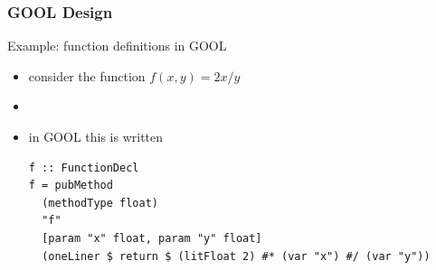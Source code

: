 \documentclass{beamer}
\begin{document}
\begin{frame}
\frametitle{GOOL Design}
{\Large Example: function definitions in GOOL\\[1cm]}
\begin{itemize}
\item consider the function $f(x, y) = 2x/y$
\item[]
\item in GOOL this is written
\begin{lstlisting}
f :: FunctionDecl
f = pubMethod
  (methodType float)
  "f"
  [param "x" float, param "y" float] 
  (oneLiner $ return $ (litFloat 2) #* (var "x") #/ (var "y"))
\end{lstlisting}
\end{itemize}
\end{frame}

% 
% 

%
%
\end{document}
